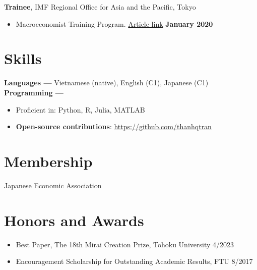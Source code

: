 \documentclass[margin,line]{res}
\begin{document}
\begin{resume}
\vspace*{.05in}
{\bf Trainee}, IMF Regional Office for Asia and the Pacific, Tokyo
\vspace*{.05in}
\begin{itemize}
\item[ ] Macroeconomist Training Program. \href{https://www.imf.org/en/Countries/ResRep/OAP-Home/~/link.aspx?_id=C2F64E8412B64A86BD37DDEB8439312B&_z=z}{Article link} \hfill {\bf January 2020}
\end{itemize}

\vspace{4mm}








\section{\sc Skills}
{\bf Languages ---}
\vspace*{.05in}
Vietnamese (native), English (C1), Japanese (C1)\\
{\bf Programming ---}
\vspace*{.05in}
\begin{itemize}
	\item Proficient in: Python, R, Julia, MATLAB
	\item {\bf Open-source contributions}: \url{https://github.com/thanhqtran}
\end{itemize}

\vspace{4mm}

\section{\sc Membership}
 Japanese Economic Association \\

\section{\sc Honors and Awards}
\begin{itemize}
\item[] Best Paper, The 18th Mirai Creation Prize, Tohoku University \hfill 4/2023
\item[] Encouragement Scholarship for Outstanding Academic Results, FTU \hfill 8/2017
\end{itemize}


\end{resume}
\end{document}
